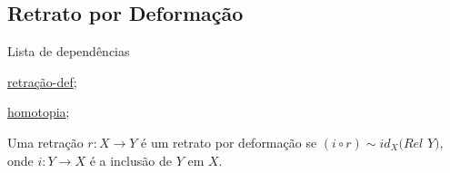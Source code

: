 \subsection{Retrato por Deformação}
\label{retrato-por-deformação-def}
\begin{titlemize}{Lista de dependências}
	\item \hyperref[retração-def]{retração-def};\\ %
	\item \hyperref[homotopia]{homotopia};\\
\end{titlemize}
\begin{defi}
	Uma retração $r:X \rightarrow Y$ é um retrato por deformação se $(i\circ r) \sim id_X \textit{(Rel Y)}$, onde $i:Y \rightarrow X$ é a inclusão de $Y$ em $X$.
\end{defi}
